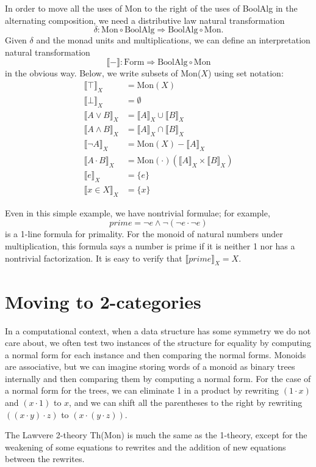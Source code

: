 \documentclass{llncs}
\newcommand{\interp}[1]{\llbracket #1 \rrbracket}
\newcommand{\maps}{\colon}
\newcommand{\Mon}{\mathrm{Mon}}
\newcommand{\BoolAlg}{\mathrm{BoolAlg}}
\renewcommand{\Form}{\mathrm{Form}}
\begin{document}
In order to move all the uses of Mon to the right of the uses of BoolAlg in the alternating composition, we need a distributive law natural transformation
\[ \delta\maps \Mon \circ \BoolAlg \Rightarrow \BoolAlg \circ \Mon. \]
Given $\delta$ and the monad units and multiplications, we can define an interpretation natural transformation
\[ \interp{-}\maps \Form\Rightarrow \BoolAlg \circ \Mon \]
in the obvious way.  Below, we write subsets of Mon($X$) using set notation:
\begin{align*}
  \interp{\top}_X &= \Mon(X)\\
  \interp{\bot}_X &= \emptyset\\
  \interp{{A}\lor{B}}_X &= \interp{A}_X \cup \interp{B}_X\\
  \interp{{A}\land{B}}_X &= \interp{A}_X \cap \interp{B}_X\\
  \interp{\neg A}_X &= \Mon(X) - \interp{A}_X\\
  \interp{{A} \cdot {B}}_X &= \Mon(\cdot)(\interp{A}_X \times \interp{B}_X)\\
  \interp{e}_X &= \{e\}\\
  \interp{x \in X}_X &= \{x\}
\end{align*}

Even in this simple example, we have nontrivial formulae; for example,
\[ prime = \neg e \land \neg(\neg e \cdot \neg e) \]
is a 1-line formula for primality.  For the monoid of natural numbers under multiplication, this formula says a number is prime if it is neither 1 nor has a nontrivial factorization.  It is easy to verify that $\interp{prime}_X = X.$

\section{Moving to 2-categories}

In a computational context, when a data structure has some symmetry we do not care about, we often test two instances of the structure for equality by computing a normal form for each instance and then comparing the normal forms.  Monoids are associative, but we can imagine storing words of a monoid as binary trees internally and then comparing them by computing a normal form.  For the case of a normal form for the trees, we can eliminate 1 in a product by rewriting $(1 \cdot x)$ and $(x \cdot 1)$ to $x$, and we can shift all the parentheses to the right by rewriting $((x \cdot y) \cdot z)$ to $(x \cdot (y \cdot z)).$

The Lawvere 2-theory Th(Mon) is much the same as the 1-theory, except for the weakening of some equations to rewrites and the addition of new equations between the rewrites.
\end{document}

